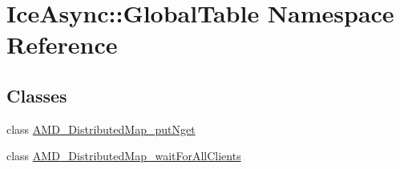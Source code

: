 \hypertarget{namespace_ice_async_1_1_global_table}{
\section{IceAsync::GlobalTable Namespace Reference}
\label{namespace_ice_async_1_1_global_table}
}
\subsection*{Classes}
\begin{DoxyCompactItemize}
\item 
class \hyperlink{class_ice_async_1_1_global_table_1_1_a_m_d___distributed_map__put_nget}{AMD\_\-DistributedMap\_\-putNget}
\item 
class \hyperlink{class_ice_async_1_1_global_table_1_1_a_m_d___distributed_map__wait_for_all_clients}{AMD\_\-DistributedMap\_\-waitForAllClients}
\end{DoxyCompactItemize}

